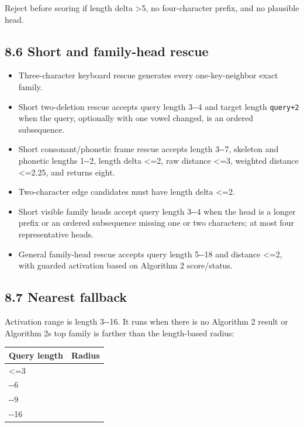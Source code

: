 Reject before scoring if length delta \textgreater5, no four-character prefix, and no plausible head.

\subsection{8.6 Short and family-head rescue}\label{86-short-and-family-head-rescue}

\begin{itemize}
\tightlist
\item
  Three-character keyboard rescue generates every one-key-neighbor exact family.
\item
  Short two-deletion rescue accepts query length 3-\/-4 and target length \texttt{query+2} when the query, optionally with one vowel changed, is an ordered subsequence.
\item
  Short consonant/phonetic frame rescue accepts length 3-\/-7, skeleton and phonetic lengths 1-\/-2, length delta \textless=2, raw distance \textless=3, weighted distance \textless=2.25, and returns eight.
\item
  Two-character edge candidates must have length delta \textless=2.
\item
  Short visible family heads accept query length 3-\/-4 when the head is a longer prefix or an ordered subsequence missing one or two characters; at most four representative heads.
\item
  General family-head rescue accepts query length 5-\/-18 and distance \textless=2, with guarded activation based on Algorithm 2 score/status.
\end{itemize}

\subsection{8.7 Nearest fallback}\label{87-nearest-fallback}

Activation range is length 3-\/-16. It runs when there is no Algorithm 2 result or Algorithm 2\textquotesingle s top family is farther than the length-based radius:

{\def\LTcaptype{none} %
\begin{longtable}[]{@{}>{\RaggedRight\arraybackslash}p{.70\linewidth}>{\RaggedRight\arraybackslash}p{.20\linewidth}@{}}
\toprule\noalign{}
Query length & Radius \\
\midrule\noalign{}
\endhead
\bottomrule\noalign{}
\endlastfoot
\textless=3 & 1 \\
4-\/-6 & 2 \\
7-\/-9 & 3 \\
10-\/-16 & 4 \\
\end{longtable}
}

